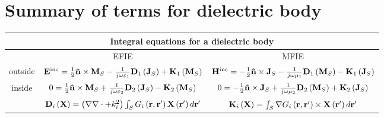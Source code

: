 \section{Summary of terms for dielectric body}
%
\par
\renewcommand{\arraystretch}{2}
\begin{table}[h!]
\centering
\begin{tabular}{|c||c|c|}
  \hline
  \multicolumn{3}{|c|}{Integral equations for a dielectric body} \\
  \hline
  \hline
   & EFIE & MFIE \\
  \hline
  outside & $\mathbf{E}^\text{inc} =  \frac{1}{2} \mathbf{\hat{n}} \times \mathbf{M}_{S} - \frac{1}{j \omega \varepsilon_1} \mathbf{D}_1 \left( \mathbf{J}_{S}\right) + \mathbf{K}_1 \left(\mathbf{M}_{S}\right)$ & $\mathbf{H}^\text{inc} = - \frac{1}{2} \mathbf{\hat{n}} \times \mathbf{J}_{S} - \frac{1}{j \omega \mu_1} \mathbf{D}_1 \left( \mathbf{M}_{S}\right) - \mathbf{K}_1 \left(\mathbf{J}_{S}\right)$ \\
  \hline
  inside  & $0 = \frac{1}{2} \mathbf{\hat{n}} \times \mathbf{M}_{S} + \frac{1}{j \omega \varepsilon_2} \mathbf{D}_2\left(\mathbf{J}_{S}\right) -  \mathbf{K}_2\left( \mathbf{M}_{S}\right)$ & $0 = - \frac{1}{2} \mathbf{\hat{n}} \times \mathbf{J}_{S} + \frac{1}{j \omega \mu_2} \mathbf{D}_2\left(\mathbf{M}_{S}\right) +  \mathbf{K}_2\left( \mathbf{J}_{S}\right)$ \\
  \hline
  \hline
 & $\mathbf{D}_i\left(\mathbf{X}\right) = \left(\nabla \nabla \cdot + k_i^2\right) \int_{S} G_i\left(\mathbf{r}, \mathbf{r}'\right) \mathbf{X}\left(\mathbf{r}'\right) d\mathbf{r}'$  & $\mathbf{K}_i\left(\mathbf{X}\right) = \int_S \nabla G_i\left(\mathbf{r}, \mathbf{r}'\right) \times \mathbf{X}\left(\mathbf{r}'\right) d\mathbf{r}'$ \\
  \hline
\end{tabular}
\end{table}

